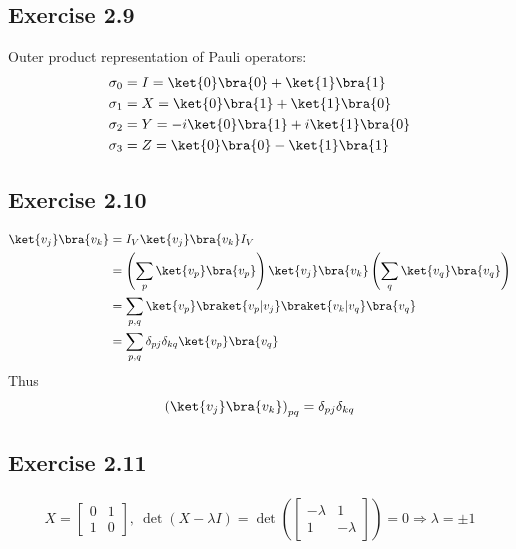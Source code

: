 \documentclass[a4paper,12pt]{article}
\begin{document}
\subsection*{Exercise 2.9}
Outer product representation of Pauli operators:
\begin{align*}
	\sigma_0 &= I = \ket{0}\bra{0} + \ket{1}\bra{1}\\
	\sigma_1 &= X = \ket{0}\bra{1} + \ket{1}\bra{0}\\
	\sigma_2 &= Y = -i\ket{0}\bra{1} + i\ket{1}\bra{0}\\
	\sigma_3 &= Z = \ket{0}\bra{0} - \ket{1}\bra{1}
\end{align*}


\subsection*{Exercise 2.10}
\begin{align*}
	\ket{v_j}\bra{v_k} &= I_V \ket{v_j} \bra{v_k} I_V\\
	&= \left(\sum_p \ket{v_p}\bra{v_p} \right) \ket{v_j}\bra{v_k} \left(\sum_q \ket{v_q}\bra{v_q} \right)\\
	&= \sum_{p,q} \ket{v_p} \braket{v_p|v_j}
	\braket{v_k | v_q} \bra{v_q}\\
	&= \sum_{p,q} \delta_{pj} \delta_{kq} \ket{v_p} \bra{v_q}
\end{align*}
Thus
\begin{align*}
	\left( \ket{v_j}\bra{v_k} \right)_{pq} = \delta_{pj} \delta_{kq}
\end{align*}



\subsection*{Exercise 2.11}
\begin{align*}
	X = \begin{bmatrix}
	0 & 1 \\
	1 & 0
	\end{bmatrix},\ \det(X-\lambda I) =
	\det \left(\begin{bmatrix}
	-\lambda & 1 \\
	1 & -\lambda
	\end{bmatrix} \right) = 0 \Rightarrow \lambda = \pm 1
\end{align*}
\end{document}
